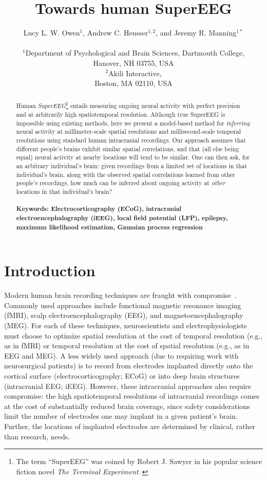 \documentclass[11pt]{article}
\title{Towards human SuperEEG}
\author{
  Lucy L. W. Owen$^{1}$,
  Andrew C. Heusser$^{1, 2}$, and
  Jeremy R. Manning$^{1\ast}$\\\\
$^{1}$Department of Psychological and Brain Sciences, Dartmouth College,\\
Hanover, NH 03755, USA\\
$^{2}$Akili Interactive,\\
Boston, MA 02110, USA}
\date{}
\begin{document}
 

\baselineskip24pt
\maketitle 

\begin{abstract}
  Human \textit{SuperEEG}\footnote{The term ``SuperEEG'' was coined by
    Robert J. Sawyer in his popular science fiction novel \textit{The
      Terminal Experiment}~\cite{Sawy95}} entails measuring ongoing
  neural activity with perfect precision and at arbitrarily high
  spatiotemporal resolution.  Although true SuperEEG is impossible
  using existing methods, here we present a model-based method for
  \textit{inferring} neural activity at millimeter-scale spatial
  resolutions and millisecond-scale temporal resolutions using
  standard human intracranial recordings.  Our approach assumes that
  different people's brains exhibit similar spatial correlations, and
  that (all else being equal) neural activity at nearby locations will
  tend to be similar.  One can then ask, for an arbitrary individual's
  brain: given recordings from a limited set of locations in that
  individual's brain, along with the observed spatial correlations
  learned from other people's recordings, how much can be inferred
  about ongoing activity at \textit{other} locations in that
  individual's brain?\\\\
  \footnotesize{\textbf{Keywords: Electrocorticography (ECoG),
      intracranial electroencephalography (iEEG), local field
      potential (LFP), epilepsy, maximum likelihood estimation,
      Gaussian process regression}}
\end{abstract}

\section*{Introduction}
Modern human brain recording techniques are fraught with
compromise~\citep{SejnEtal14}.  Commonly used approaches include
functional magnetic resonance imaging (fMRI), scalp
electroencephalography (EEG), and magnetoencephalography (MEG).  For
each of these techniques, neuroscientists and electrophysiologists
must choose to optimize spatial resolution at the cost of temporal
resolution (e.g., as in fMRI) or temporal resolution at the cost of
spatial resolution (e.g., as in EEG and MEG).  A less widely used
approach (due to requiring work with neurosurgical patients) is to
record from electrodes implanted directly onto the cortical surface
(electrocorticography; ECoG) or into deep brain structures
(intracranial EEG; iEEG).  However, these intracranial approaches also
require compromise: the high spatiotemporal resolutions of
intracranial recordings comes at the cost of substantially reduced
brain coverage, since safety considerations limit the number of
electrodes one may implant in a given patient's brain.  Further, the
locations of implanted electrodes are determined by clinical, rather
than research, needs.
\end{document}
